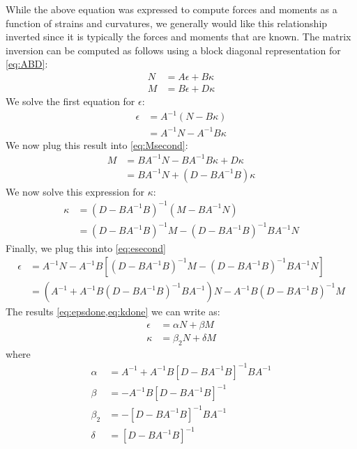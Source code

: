 \documentclass{article}
\begin{document}
While the above equation was expressed to compute forces and moments as a function of strains and curvatures, we generally would like this relationship inverted since it is typically the forces and moments that are known. The matrix inversion can be computed as follows using a block diagonal representation for \cref{eq:ABD}:
\begin{align}
N &= A \epsilon + B \kappa \\
M &= B \epsilon + D \kappa  \label{eq:Msecond}
\end{align}
We solve the first equation for $\epsilon$:
\begin{equation}
\begin{aligned}
\epsilon &= A^{-1}(N - B \kappa)\\
 &= A^{-1}N - A^{-1} B \kappa \label{eq:esecond}
\end{aligned}
\end{equation}
We now plug this result into \cref{eq:Msecond}:
\begin{equation}
\begin{aligned}
M &= B A^{-1}N - B A^{-1} B \kappa + D \kappa\\
 &= B A^{-1} N + (D - B A^{-1} B) \kappa
\end{aligned}
\end{equation}
We now solve this expression for $\kappa$:
\begin{equation}
\begin{aligned}
\kappa &= (D - B A^{-1} B)^{-1} (M - B A^{-1} N )\\
 &= (D - B A^{-1} B)^{-1} M - (D - B A^{-1} B)^{-1} B A^{-1} N \label{eq:kdone}
\end{aligned}
\end{equation}
Finally, we plug this into \cref{eq:esecond}
\begin{equation}
\begin{aligned}
\epsilon &= A^{-1}N - A^{-1} B \left[(D - B A^{-1} B)^{-1} M - (D - B A^{-1} B)^{-1} B A^{-1} N \right] \\
&= (A^{-1} + A^{-1} B (D - B A^{-1} B)^{-1} B A^{-1} ) N - A^{-1} B (D - B A^{-1} B)^{-1} M \label{eq:epsdone}
\end{aligned}
\end{equation}
The results \cref{eq:epsdone,eq:kdone} we can write as:
\begin{align}
\epsilon &= \alpha N + \beta M \\
\kappa &= \beta_2 N + \delta M
\end{align}
where
\begin{align}
\alpha &= A^{-1} + A^{-1} B [D - B A^{-1} B]^{-1} B A^{-1}\\
\beta &= - A^{-1} B [D - B A^{-1} B]^{-1}\\
\beta_2 &= - [D - B A^{-1} B]^{-1} B A^{-1}\\
\delta &= [D - B A^{-1} B]^{-1}
\end{align}
\end{document}

